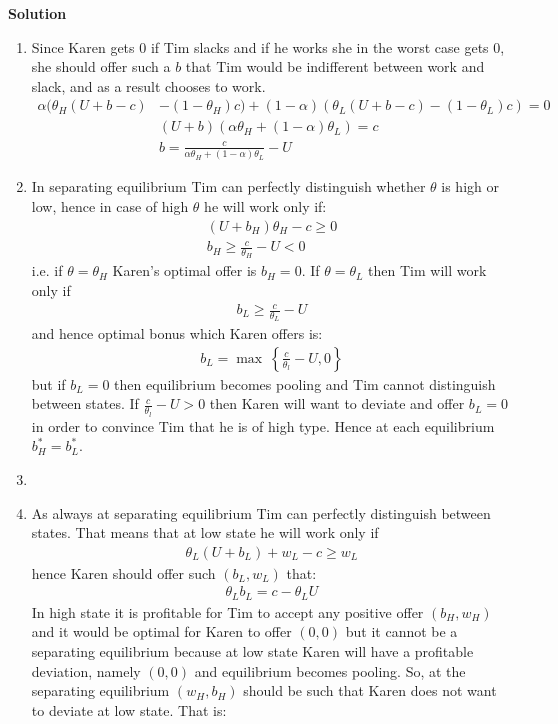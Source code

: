 \documentclass[a4paper]{article}
\begin{document}
\textbf{Solution}

\begin{enumerate}
	\item Since Karen gets 0 if Tim slacks and if he works she in the worst case gets 0, she should offer such a $b$ that Tim would be indifferent between work and slack, and as a result chooses to work.
	\begin{align*}
	\alpha(\theta_H(U + b - c) &- (1 - \theta_H)c) + (1 - \alpha)(\theta_L(U + b - c) - (1 - \theta_L)c) = 0\\
	&(U+b)(\alpha\theta_H + (1 - \alpha)\theta_L) = c\\
	&b = \frac{c}{\alpha\theta_H + (1 - \alpha)\theta_L} - U
	\end{align*}
	\item In separating equilibrium Tim can perfectly distinguish whether $\theta$ is high or low, hence in case of high $\theta$ he will work only if:
	\begin{align*}
	(U + b_H)\theta_H - c \ge 0\\
	b_H \ge \frac{c}{\theta_H} - U < 0
	\end{align*}
	i.e. if $\theta = \theta_H$ Karen's optimal offer is $b_H = 0$. If $\theta = \theta_L$ then Tim will work only if
	\begin{align*}
	b_L \ge \frac{c}{\theta_L} - U
	\end{align*}
	and hence optimal bonus which Karen offers is:
	\begin{align*}
	b_L = \max\ \left\{\frac{c}{\theta_l} - U, 0\right\}
	\end{align*}
	but if $b_L = 0$ then equilibrium becomes pooling and Tim cannot distinguish between states. If $\frac{c}{\theta_l} - U > 0$ then Karen will want to deviate and offer $b_L = 0$ in order to convince Tim that he is of high type. Hence at each equilibrium $b^*_H = b^*_L$.
	\item 
	\item  As always at separating equilibrium Tim can perfectly distinguish between states. That means that at low state he will work only if
	\begin{align*}
	\theta_L(U + b_L) + w_L - c \ge w_L
	\end{align*}
	hence Karen should offer such $(b_L, w_L)$ that:
	\begin{align*}
	\theta_L b_L = c - \theta_LU
	\end{align*}
	In high state it is profitable for Tim to accept any positive offer $(b_H, w_H)$ and it would be optimal for Karen to offer $(0, 0)$ but it cannot be a separating equilibrium because at low state Karen will have a profitable deviation, namely $(0, 0)$ and equilibrium becomes pooling. So, at the separating equilibrium $(w_H, b_H)$ should be such that Karen does not want to deviate at low state. That is:

\end{enumerate}
\end{document}
